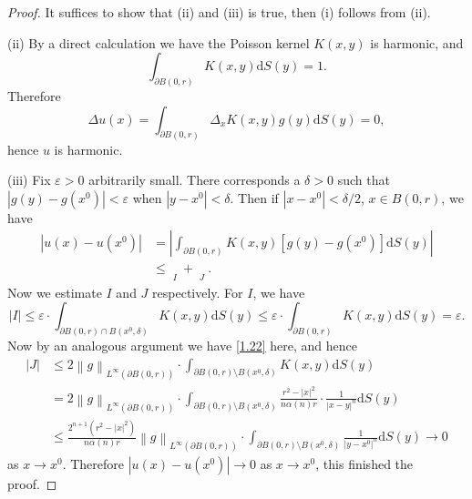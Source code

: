 \begin{proof}
It suffices to show that (ii) and (iii) is true, then (i) follows from (ii).\par
(ii) By a direct calculation we have the Poisson kernel $K(x,y)$ is harmonic, and 
$$
\int_{\partial B\left( 0,r \right)}{K\left( x,y \right) \mathrm{d}S\left( y \right)}=1.
$$
Therefore 
$$
\Delta u\left( x \right) =\int_{\partial B\left( 0,r \right)}{\Delta _xK\left( x,y \right) g\left( y \right) \mathrm{d}S\left( y \right)}=0,
$$
hence $u$ is harmonic.\par
(iii) Fix $\varepsilon>0$ arbitrarily small. There corresponds a $\delta>0$ such that $|g(y)-g(x^0)|<\varepsilon$ when $|y-x^0|<\delta$. Then if $|x-x^0|<\delta/2$, $x\in B(0,r)$, we have 
$$
\begin{aligned}
\left| u\left( x \right) -u\left( x^0 \right) \right|&=\left| \int_{\partial B\left( 0,r \right)}{K\left( x,y \right) \left[ g\left( y \right) -g\left( x^0 \right) \right] \mathrm{d}S\left( y \right)} \right|
\\
&\le \mathop {\underbrace{\int_{\partial B\left( 0,r \right) \cap B\left( x^0,\delta \right)}{K\left( x,y \right) \cdot \left| g\left( y \right) -g\left( x^0 \right) \right|\mathrm{d}S\left( y \right)}}} \limits_{I}+\mathop {\underbrace{\int_{\partial B\left( 0,r \right) \setminus B\left( x^0,\delta \right)}{K\left( x,y \right) \cdot \left| g\left( y \right) -g\left( x^0 \right) \right|\mathrm{d}S\left( y \right)}}} \limits_{J}.
\end{aligned}
$$
Now we estimate $I$ and $J$ respectively. For $I$, we have 
$$
\left| I \right|\le \varepsilon \cdot \int_{\partial B\left( 0,r \right) \cap B\left( x^0,\delta \right)}{K\left( x,y \right) \mathrm{d}S\left( y \right)}\le \varepsilon \cdot \int_{\partial B\left( 0,r \right)}{K\left( x,y \right) \mathrm{d}S\left( y \right)}=\varepsilon .
$$
Now by an analogous argument we have \eqref{1.22} here, and hence 
$$
\begin{aligned}
\left| J \right|&\le 2\left\| g \right\| _{L^{\infty}\left( \partial B\left( 0,r \right) \right)}\cdot \int_{\partial B\left( 0,r \right) \setminus B\left( x^0,\delta \right)}{K\left( x,y \right) \mathrm{d}S\left( y \right)}
\\
&=2\left\| g \right\| _{L^{\infty}\left( \partial B\left( 0,r \right) \right)}\cdot \int_{\partial B\left( 0,r \right) \setminus B\left( x^0,\delta \right)}{\frac{r^2-\left| x \right|^2}{n\alpha \left( n \right) r}\cdot \frac{1}{\left| x-y \right|^n}\mathrm{d}S\left( y \right)}
\\
&\le \frac{2^{n+1}\left( r^2-\left| x \right|^2 \right)}{n\alpha \left( n \right) r}\left\| g \right\| _{L^{\infty}\left( \partial B\left( 0,r \right) \right)}\cdot \int_{\partial B\left( 0,r \right) \setminus B\left( x^0,\delta \right)}{\frac{1}{\left| y-x^0 \right|^n}\mathrm{d}S\left( y \right)}\rightarrow 0
\end{aligned}
$$
as $x\to x^0$. Therefore $|u(x)-u(x^0)|\to 0$ as $x\to x^0$, this finished the proof.
\end{proof}
